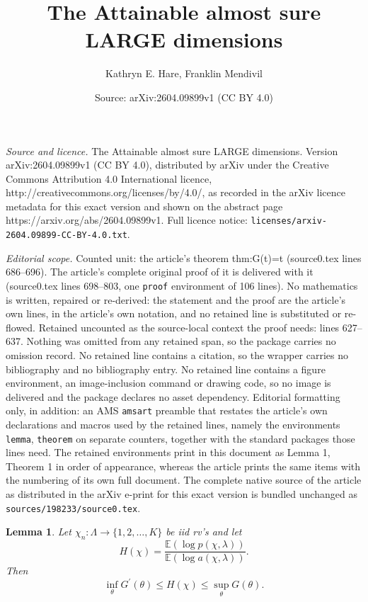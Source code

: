 \documentclass[10pt,a4paper]{amsart}
\title{The Attainable almost sure LARGE dimensions}
\author{Kathryn E. Hare, Franklin Mendivil}
\date{Source: arXiv:2604.09899v1 (CC BY 4.0)}
\newtheorem{lemma}{Lemma}
\newcommand{\ee}{{\mathbb E}}
\begin{document}
\maketitle

\noindent\emph{Source and licence.} The Attainable almost sure LARGE dimensions. Version arXiv:2604.09899v1 (CC BY 4.0), distributed by arXiv under the Creative Commons Attribution 4.0 International licence, http://creativecommons.org/licenses/by/4.0/, as recorded in the arXiv licence metadata for this exact version and shown on the abstract page https://arxiv.org/abs/2604.09899v1. Full licence notice: \texttt{licenses/arxiv-2604.09899-CC-BY-4.0.txt}.\par\smallskip

\noindent\textit{Editorial scope.} Counted unit: the article's theorem thm:G(t)=t (source0.tex lines 686--696). The article's complete original proof of it is delivered with it (source0.tex lines 698--803, one \texttt{proof} environment of 106 lines). No mathematics is written, repaired or re-derived: the statement and the proof are the article's own lines, in the article's own notation, and no retained line is substituted or re-flowed.  Retained uncounted as the source-local context the proof needs: lines 627--637.  Nothing was omitted from any retained span, so the package carries no omission record.  No retained line contains a citation, so the wrapper carries no bibliography and no bibliography entry.  No retained line contains a figure environment, an image-inclusion command or drawing code, so no image is delivered and the package declares no asset dependency.  Editorial formatting only, in addition: an AMS \texttt{amsart} preamble that restates the article's own declarations and macros used by the retained lines, namely the environments \texttt{lemma}, \texttt{theorem} on separate counters, together with the standard packages those lines need.  The retained environments print in this document as Lemma 1, Theorem 1 in order of appearance, whereas the article prints the same items with the numbering of its own full document.  The complete native source of the article as distributed in the arXiv e-print for this exact version is bundled unchanged as \texttt{sources/198233/source0.tex}.
\begin{lemma}
\label{lem:H-function}
Let $\chi _{n}:\Lambda \to \{1,2, \ldots, K\}$ be iid rv's  and let 
\begin{equation*}
    H(\chi )=\frac{\ee(\log p(\chi ,\lambda ))}{\ee(\log a(\chi,\lambda ))}.
\end{equation*}
Then 
\begin{equation*}
    \inf_{\theta }G^{\prime }(\theta )\leq H(\chi )\leq \sup_{\theta }G(\theta ).
\end{equation*}
\end{lemma}
\end{document}
